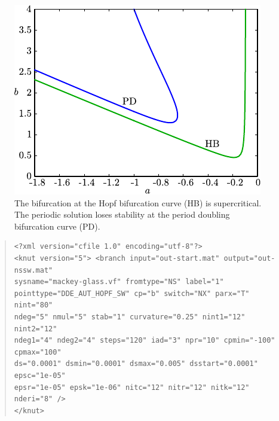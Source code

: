 \documentclass[10pt,a4paper]{ddedoc}
\begin{document}
\begin{figure}[t!]
\begin{center}
\includegraphics{fig/plot-pd-ns}
\end{center}
\caption{The bifurcation at the Hopf bifurcation curve (HB) is supercritical. 
The periodic solution loses stability at the period doubling bifurcation curve (PD).}
\label{pdbif}
\end{figure}

{ \small \begin{quote} \begin{lstlisting}[basicstyle=\tt,frame=single]
<?xml version="cfile 1.0" encoding="utf-8"?>
<knut version="5"> <branch input="out-start.mat" output="out-nssw.mat"
sysname="mackey-glass.vf" fromtype="NS" label="1"
pointtype="DDE_AUT_HOPF_SW" cp="b" switch="NX" parx="T" nint="80"
ndeg="5" nmul="5" stab="1" curvature="0.25" nint1="12" nint2="12"
ndeg1="4" ndeg2="4" steps="120" iad="3" npr="10" cpmin="-100" cpmax="100"
ds="0.0001" dsmin="0.0001" dsmax="0.005" dsstart="0.0001" epsc="1e-05"
epsr="1e-05" epsk="1e-06" nitc="12" nitr="12" nitk="12" nderi="8" />
</knut>
\end{lstlisting} \end{quote} } \noindent
\end{document}
